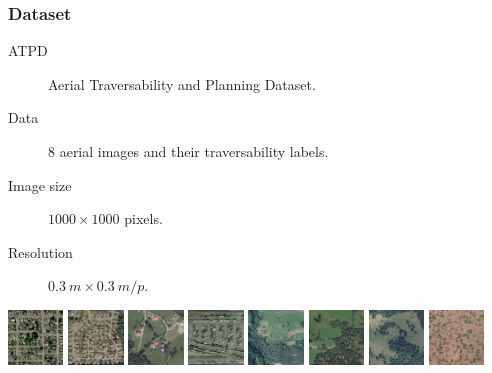 \documentclass[usenames,dvipsnames,10pt]{beamer}
\begin{document}
\begin{frame}
\frametitle{Dataset}
\begin{description}
	\item[ATPD] Aerial Traversability and Planning Dataset.
	\item[Data] 8 aerial images and their traversability labels.
	\item[Image size] $1000 \times 1000$ pixels.
	\item[Resolution] $0.3\ m \times 0.3 \ m/p$.
\end{description}
\centering
\includegraphics[width=0.11\textwidth]{graphics/aerial01.jpg}
\includegraphics[width=0.11\textwidth]{graphics/aerial02.jpg}
\includegraphics[width=0.11\textwidth]{graphics/aerial03.jpg}
\includegraphics[width=0.11\textwidth]{graphics/aerial04.jpg}
\includegraphics[width=0.11\textwidth]{graphics/aerial05.jpg}
\includegraphics[width=0.11\textwidth]{graphics/aerial06.jpg}
\includegraphics[width=0.11\textwidth]{graphics/aerial07.jpg}
\includegraphics[width=0.11\textwidth]{graphics/aerial08.jpg}


\end{frame}
\end{document}

